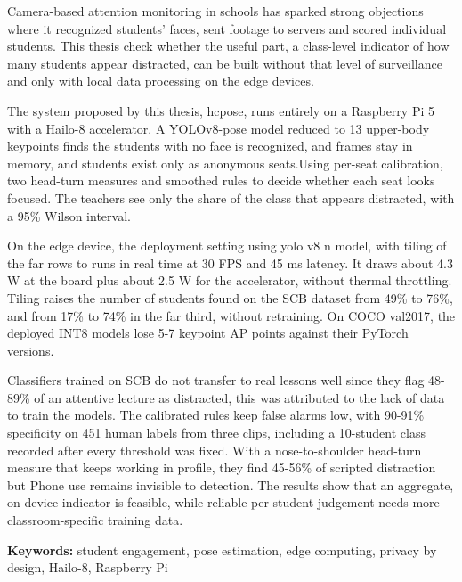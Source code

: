 Camera-based attention monitoring in schools has sparked strong objections where it recognized students' faces, sent footage to servers and scored individual students. This thesis check whether the useful part, a class-level indicator of how many students appear distracted, can be built without that level of surveillance and only with local data processing on the edge devices.

The system proposed by this thesis, hcpose, runs entirely on a Raspberry Pi 5 with a Hailo-8 accelerator. A YOLOv8-pose model reduced to 13 upper-body keypoints finds the students with no face is recognized, and frames stay in memory, and students exist only as anonymous seats.Using per-seat calibration, two head-turn measures and smoothed rules to decide whether each seat looks focused. The teachers see only the share of the class that appears distracted, with a 95\% Wilson interval.

On the edge device, the deployment setting using yolo v8 n model, with tiling of the far rows to runs in real time at 30 FPS and 45 ms latency. It draws about 4.3 W at the board plus about 2.5 W for the accelerator, without thermal throttling. Tiling raises the number of students found on the SCB dataset from 49\% to 76\%, and from 17\% to 74\% in the far third, without retraining. On COCO val2017, the deployed INT8 models lose 5-7 keypoint AP points against their PyTorch versions.

Classifiers trained on SCB do not transfer to real lessons well since they flag 48-89\% of an attentive lecture as distracted, this was attributed to the lack of data to train the models. The calibrated rules keep false alarms low, with 90-91\% specificity on 451 human labels from three clips, including a 10-student class recorded after every threshold was fixed. With a nose-to-shoulder head-turn measure that keeps working in profile, they find 45-56\% of scripted distraction but Phone use remains invisible to detection. The results show that an aggregate, on-device indicator is feasible, while reliable per-student judgement needs more classroom-specific training data.

\textbf{Keywords:} student engagement, pose estimation, edge computing, privacy by design, Hailo-8, Raspberry Pi
